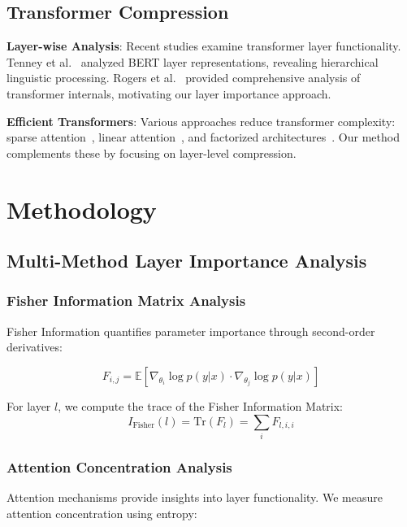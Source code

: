 \documentclass[sigconf]{acmart}
\begin{document}
\subsection{Transformer Compression}

\textbf{Layer-wise Analysis}: Recent studies examine transformer layer functionality. Tenney et al.~\cite{tenney2019you} analyzed BERT layer representations, revealing hierarchical linguistic processing. Rogers et al.~\cite{rogers2020primer} provided comprehensive analysis of transformer internals, motivating our layer importance approach.

\textbf{Efficient Transformers}: Various approaches reduce transformer complexity: sparse attention~\cite{beltagy2020longformer}, linear attention~\cite{katharopoulos2020transformers}, and factorized architectures~\cite{kitaev2020reformer}. Our method complements these by focusing on layer-level compression.

\section{Methodology}

\subsection{Multi-Method Layer Importance Analysis}

\subsubsection{Fisher Information Matrix Analysis}

Fisher Information quantifies parameter importance through second-order derivatives:

\begin{equation}
F_{i,j} = \mathbb{E}[\nabla_{\theta_i} \log p(y|x) \cdot \nabla_{\theta_j} \log p(y|x)]
\end{equation}

For layer $l$, we compute the trace of the Fisher Information Matrix:
\begin{equation}
I_{\text{Fisher}}(l) = \text{Tr}(F_l) = \sum_i F_{l,i,i}
\end{equation}

\subsubsection{Attention Concentration Analysis}

Attention mechanisms provide insights into layer functionality. We measure attention concentration using entropy:
\end{document}
